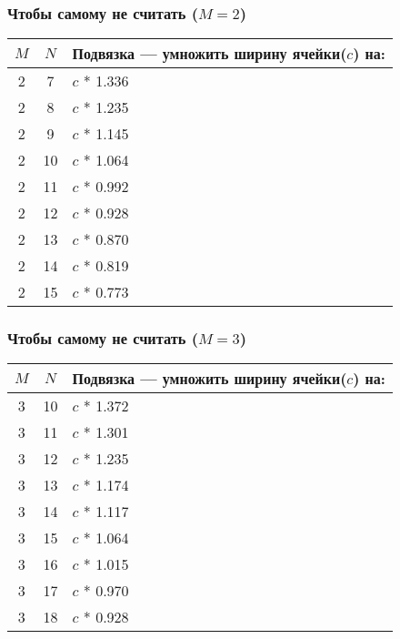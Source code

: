 \begin{frame}
    \frametitle{Чтобы самому не считать ($M=2$)}

	\begin{center}	
		\begin{tabular}{c|c|l}
			\hline\hline
			$M$ & $N$ &Подвязка --- умножить ширину ячейки($c$) на: \\ 
			\hline\hline
			2 & 7	& $c$ * 1.336 \\
			2 & 8	& $c$ * 1.235 \\
			2 & 9	& $c$ * 1.145 \\
			2 & 10	& $c$ * 1.064 \\
			2 & 11	& $c$ * 0.992 \\
			2 & 12	& $c$ * 0.928 \\
			2 & 13	& $c$ * 0.870 \\
			2 & 14	& $c$ * 0.819 \\
			2 & 15	& $c$ * 0.773 \\
			\hline		
		\end{tabular}
	\end{center}	
\end{frame}

\begin{frame}
    \frametitle{Чтобы самому не считать ($M=3$)}
	
	\begin{center}	
		\begin{tabular}{c|c|l}
			\hline\hline
			$M$ & $N$ &Подвязка --- умножить ширину ячейки($c$) на: \\ 
			\hline\hline
			3 & 10 & $c$ * 1.372 \\
			3 & 11 & $c$ * 1.301 \\
			3 & 12 & $c$ * 1.235 \\
			3 & 13 & $c$ * 1.174 \\
			3 & 14 & $c$ * 1.117 \\
			3 & 15 & $c$ * 1.064 \\
			3 & 16 & $c$ * 1.015 \\
			3 & 17 & $c$ * 0.970 \\
			3 & 18 & $c$ * 0.928 \\
		\hline		
		\end{tabular}
	\end{center}	
\end{frame}

